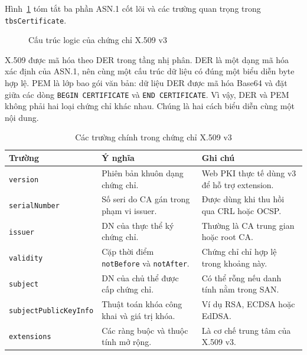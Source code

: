 Hình~\ref{fig:x509-structure} tóm tắt ba phần ASN.1 cốt lõi và các trường quan trọng trong \texttt{tbsCertificate}.

\begin{figure}[htbp]
    \centering
    \caption{Cấu trúc logic của chứng chỉ X.509 v3}
    \label{fig:x509-structure}
\end{figure}

X.509 được mã hóa theo DER trong tầng nhị phân. DER là một dạng
mã hóa xác định của ASN.1, nên cùng một cấu trúc dữ liệu có đúng
một biểu diễn byte hợp lệ. PEM là lớp bao gói văn bản: dữ liệu DER
được mã hóa Base64 và đặt giữa các dòng
\texttt{BEGIN CERTIFICATE} và
\texttt{END CERTIFICATE}. Vì vậy, DER và PEM không phải
hai loại chứng chỉ khác nhau. Chúng là hai cách biểu diễn cùng một
nội dung.

\begin{table}[ht]
    \centering
    \caption{Các trường chính trong chứng chỉ X.509 v3}
    \label{tab:x509-fields}
    \small
    \begin{tabularx}{\textwidth}{@{} p{}p{}p{} @{}}
        \toprule
        \textbf{Trường} & \textbf{Ý nghĩa} & \textbf{Ghi chú} \\
        \midrule
        \texttt{version}
            & Phiên bản khuôn dạng chứng chỉ.
            & Web PKI thực tế dùng v3 để hỗ trợ extension. \\
        \texttt{serialNumber}
            & Số seri do CA gán trong phạm vi issuer.
            & Được dùng khi thu hồi qua CRL hoặc OCSP. \\
        \texttt{issuer}
            & DN của thực thể ký chứng chỉ.
            & Thường là CA trung gian hoặc root CA. \\
        \texttt{validity}
            & Cặp thời điểm \texttt{notBefore} và \texttt{notAfter}.
            & Chứng chỉ chỉ hợp lệ trong khoảng này. \\
        \texttt{subject}
            & DN của chủ thể được cấp chứng chỉ.
            & Có thể rỗng nếu danh tính nằm trong SAN. \\
        \texttt{subjectPublicKeyInfo}
            & Thuật toán khóa công khai và giá trị khóa.
            & Ví dụ RSA, ECDSA hoặc EdDSA. \\
        \texttt{extensions}
            & Các ràng buộc và thuộc tính mở rộng.
            & Là cơ chế trung tâm của X.509 v3. \\
        \bottomrule
    \end{tabularx}
\end{table}

